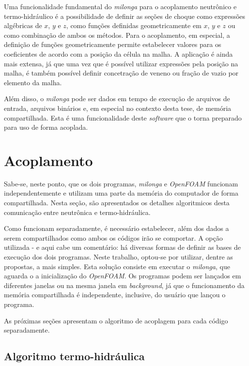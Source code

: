 Uma funcionalidade fundamental do \textit{milonga} para o acoplamento neutrônico
e termo-hidráulico é a possibilidade de definir as seções de choque como expressões
algébricas de $x$, $y$ e $z$, como funções definidas geometricamente em $x$, $y$ e $z$
ou como combinação de ambos os métodos. Para o acoplamento, em especial, a definição
de funções geometricamente permite estabelecer valores para os coeficientes de
acordo com a posição da célula na malha. A aplicação é ainda mais extensa, já que
uma vez que é possível utilizar expressões pela posição na malha, é também
possível definir concetração de veneno ou fração de vazio por elemento da malha.

Além disso, o \textit{milonga} pode ser dados em tempo de execução de arquivos de
entrada, arquivos binários e, em especial no contexto desta tese, de memória compartilhada.
Esta é uma funcionalidade deste \textit{software} que o torna preparado para uso de
forma acoplada.


\section{Acoplamento}
\label{sec:acoplamento}

Sabe-se, neste ponto, que os dois programas, \textit{milonga} e \textit{OpenFOAM} funcionam
independentemente e utilizam uma parte da memória do computador de forma compartilhada.
Nesta seção, são apresentados os detalhes algoritmicos desta comunicação entre neutrônica e
termo-hidráulica.

Como funcionam separadamente, é necessário estabelecer, além dos dados a serem compartilhados
como ambos os códigos irão se comportar. A opção utilizada - e aqui cabe um comentário: há diversas
formas de definir as bases de execução dos dois programas. Neste trabalho, optou-se por utilizar,
dentre as propostas, a mais simples. Esta solução consiste em executar o \textit{milonga}, que aguarda
o a inicialização do \textit{OpenFOAM}. Os programas podem ser lançados em diferentes janelas ou
na mesma janela em \textit{background}, já que o funcionamento da memória compartilhada é independente,
inclusive, do usuário que lançou o programa.

As próximas seções apresentam o algoritmo de acoplagem para cada código separadamente.


\subsection{Algoritmo termo-hidráulica}
\label{subsec:th}

